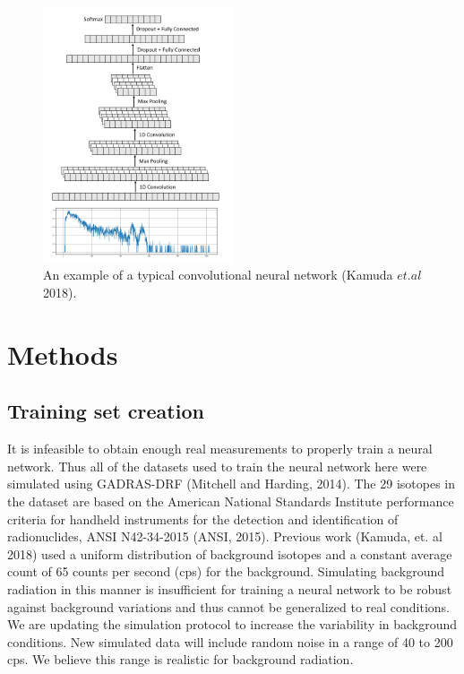 \documentclass{anstrans}
\begin{document}
\begin{figure}[h]
	\centering
	\includegraphics[width=0.5\textwidth]{cnn-figure.png}
	\caption{An example of a typical convolutional neural network (Kamuda $et. al$ 2018).}
	\label{fig:cnn}
\end{figure}

\section{Methods}
\subsection{Training set creation}
It is infeasible to obtain enough real measurements to properly train a neural network. 
Thus all of the datasets used to train the neural network here were simulated using GADRAS-DRF (Mitchell and Harding, 2014). 
The 29 isotopes in the dataset are based on the American National Standards Institute performance criteria for handheld instruments for the detection and identification of radionuclides, ANSI N42-34-2015 (ANSI, 2015). 
Previous work (Kamuda, et. al 2018) used a uniform distribution of background isotopes and a constant average count of 65 counts per second (cps) for the background. 
Simulating background radiation in this manner is insufficient for training a neural network to be robust against background variations and thus cannot be generalized to real conditions. 
We are updating the simulation protocol to increase the variability in background conditions. New simulated data will include random noise in a range of 40 to 200 cps. 
We believe this range is realistic for background radiation.
\end{document}
